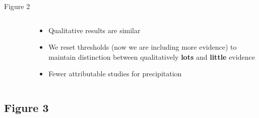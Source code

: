 \documentclass[9pt,aspectratio=169]{beamer}
\begin{document}
\begin{frame}{Figure 2}
\begin{columns}
	\begin{column}{0.682\linewidth}
		\begin{figure}
		\end{figure}
		
	\end{column}
	\begin{column}{0.318\linewidth}
		\begin{itemize}
			\item Qualitative results are similar
			\item We reset thresholds (now we are including more evidence) to maintain distinction between qualitatively \textbf{lots} and \textbf{little} evidence
			\item Fewer attributable studies for precipitation
		\end{itemize}
	\end{column}
\end{columns}
\end{frame}


\subsection{Figure 3}
\end{document}
